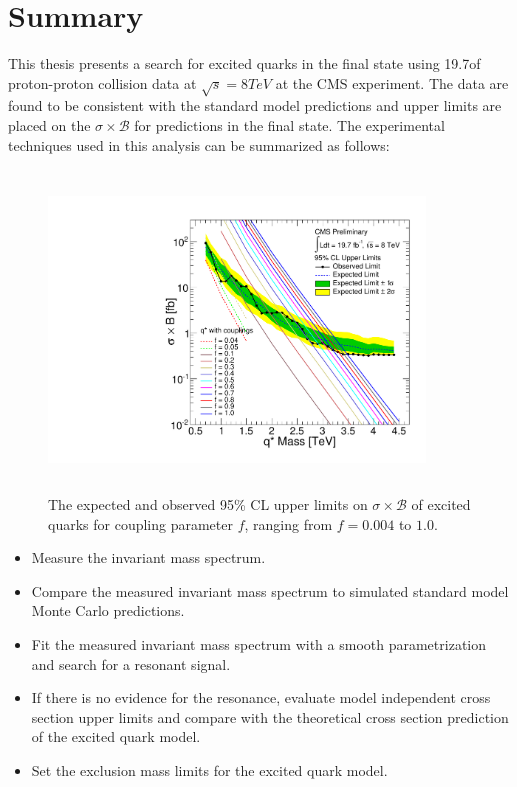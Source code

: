 \section{Summary}
This thesis presents a search for excited quarks in the \gamjet final state using 19.7\fbinv of proton-proton collision data at $\sqrt{s}=8\unit{TeV}$
at the CMS experiment. The data are found to be consistent with the standard model predictions and upper limits are placed on the $\sigma\times\mathcal{B}$
for \qstar predictions in the \gamjet final state. The experimental techniques used in this analysis can be summarized as follows:
\begin{figure}[h!]
\centering
 \includegraphics[width=10cm,height=8.5cm]{ch6/plots/ExcitedQuarksToGJ_AllCouplings_ObseExp_xsAccEff_Limits_fb.pdf}
 \caption{The expected and observed 95\% CL upper limits on $\sigma\times\mathcal{B}$ of excited quarks for coupling parameter $f$, ranging from 
          $f=0.004$ to $1.0$.}
 \label{fig:LimitAllCouplings}
\end{figure}
\begin{itemize}
\item Measure the \gamjet invariant mass spectrum.
\item Compare the measured invariant mass spectrum to simulated standard model Monte Carlo predictions. 
\item Fit the measured \gamjet invariant mass spectrum with a smooth parametrization and search for a resonant signal. 
\item If there is no evidence for the \gamjet resonance, evaluate model independent cross section upper limits and compare with the theoretical 
cross section prediction of the excited quark model.
\item Set the exclusion mass limits for the excited quark model. 
\end{itemize}
